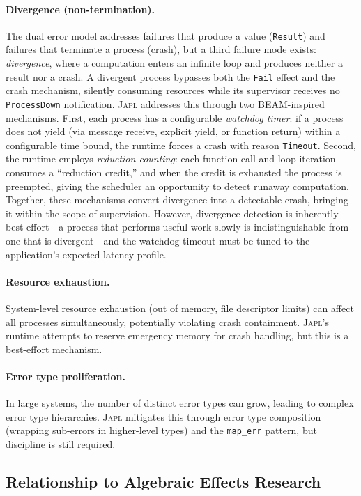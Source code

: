 \documentclass[11pt,twocolumn]{article}
\newcommand{\japl}{\textsc{Japl}}
\newcommand{\Fail}{\texttt{Fail}}
\newcommand{\Result}{\texttt{Result}}
\begin{document}
\paragraph{Divergence (non-termination).} The dual error model addresses failures that produce a value (\Result{}) and failures that terminate a process (crash), but a third failure mode exists: \emph{divergence}, where a computation enters an infinite loop and produces neither a result nor a crash. A divergent process bypasses both the \Fail{} effect and the crash mechanism, silently consuming resources while its supervisor receives no \texttt{ProcessDown} notification. \japl{} addresses this through two BEAM-inspired mechanisms. First, each process has a configurable \emph{watchdog timer}: if a process does not yield (via message receive, explicit yield, or function return) within a configurable time bound, the runtime forces a crash with reason \texttt{Timeout}. Second, the runtime employs \emph{reduction counting}: each function call and loop iteration consumes a ``reduction credit,'' and when the credit is exhausted the process is preempted, giving the scheduler an opportunity to detect runaway computation. Together, these mechanisms convert divergence into a detectable crash, bringing it within the scope of supervision. However, divergence detection is inherently best-effort---a process that performs useful work slowly is indistinguishable from one that is divergent---and the watchdog timeout must be tuned to the application's expected latency profile.

\paragraph{Resource exhaustion.} System-level resource exhaustion (out of memory, file descriptor limits) can affect all processes simultaneously, potentially violating crash containment. \japl{}'s runtime attempts to reserve emergency memory for crash handling, but this is a best-effort mechanism.

\paragraph{Error type proliferation.} In large systems, the number of distinct error types can grow, leading to complex error type hierarchies. \japl{} mitigates this through error type composition (wrapping sub-errors in higher-level types) and the \texttt{map\_err} pattern, but discipline is still required.

\subsection{Relationship to Algebraic Effects Research}
\end{document}
